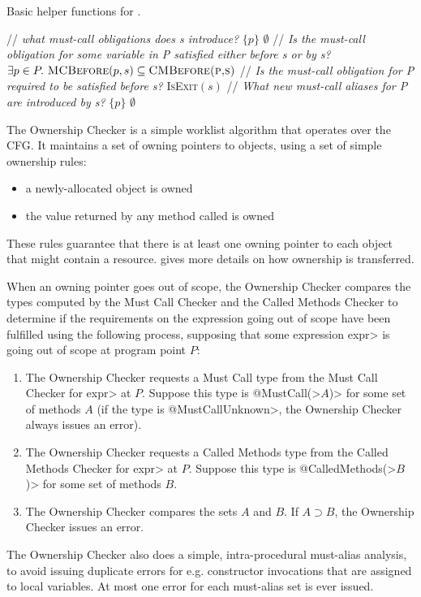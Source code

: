 \begin{algorithm}
  \caption{Basic helper functions for .}
  \begin{algorithmic}[1]
  \State // \textit{what must-call obligations does s introduce?}
    \State \Return $\{ p \}$
  \Else
    \State \Return $\emptyset$
  \EndIf
  \EndProcedure
  \State // \textit{Is the must-call obligation for some variable in P satisfied either before s or by s?}
  \State \Return $\exists p \in P .\ \textsc{MCBefore}(p,s) \subseteq \textsc{CMBefore(p,s)}$
  \EndProcedure
  \State // \textit{Is the must-call obligation for P required to be satisfied before s?}
  \State \Return \textsc{IsExit}$(s)$
  \EndProcedure
  \State // \textit{What new must-call aliases for P are introduced by s?}
    \State \Return $\{ p \}$
  \Else
    \State \Return $\emptyset$
  \EndIf
  \EndProcedure
  \end{algorithmic}

\end{algorithm}

The Ownership Checker is a simple worklist algorithm that operates over the CFG.
It maintains a set of owning pointers to objects, using a set of simple
ownership rules:
\begin{itemize}
\item a newly-allocated object is owned
\item the value returned by any method called is owned
\end{itemize}

These rules guarantee that there is at least one owning pointer to each
object that might contain a resource. 
gives more details on how ownership is transferred.

When an owning pointer goes out of scope, the Ownership Checker
compares the types computed by the Must Call Checker and the Called
Methods Checker to determine if the requirements on the expression
going out of scope have been fulfilled using the following process,
supposing that some expression \<expr> is going out of scope at
program point $P$:
\begin{enumerate}
  \item The Ownership Checker requests a Must Call type from the Must
    Call Checker for \<expr> at $P$. Suppose this type is
    \<@MustCall(>$A$\<)> for some set of methods $A$ (if the type is
    \<@MustCallUnknown>, the Ownership Checker always issues an
    error).
  \item The Ownership Checker requests a Called Methods type from the
    Called Methods Checker for \<expr> at $P$. Suppose this type is
    \<@CalledMethods(>$B$\<)> for some set of methods $B$.
  \item The Ownership Checker compares the sets $A$ and $B$. If
    $A \supset B$, the Ownership Checker issues an error.
\end{enumerate}

The Ownership Checker also does a simple, intra-procedural must-alias
analysis, to avoid issuing duplicate errors for e.g. constructor
invocations that are assigned to local variables. At most one error
for each must-alias set is ever issued. 
